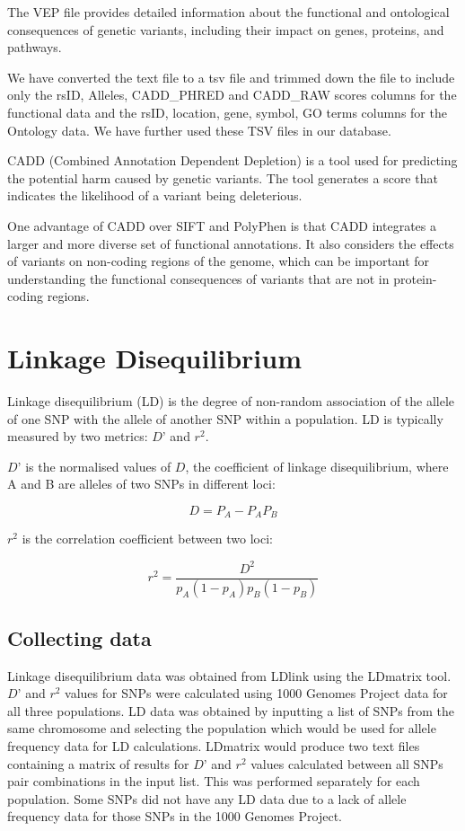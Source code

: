 \documentclass[12pt,a4paper]{article}
\newcommand{\sect}[1]{
\FloatBarrier %
\hypertarget{#1}{
\section{#1}\label{#1}}
}
\newcommand{\subsect}[1]{
\hypertarget{#1}{
\subsection{#1}\label{#1}}
}
\begin{document}
The VEP file provides detailed information about the functional and ontological consequences of genetic variants, including their impact on genes, proteins, and pathways.

We have converted the text file to a tsv file and trimmed down the file to include only the rsID, Alleles, CADD\_PHRED and CADD\_RAW scores columns for the functional data and the rsID, location, gene, symbol, GO terms columns for the Ontology data. We have further used these TSV files in our database.

CADD (Combined Annotation Dependent Depletion) is a tool used for predicting the potential harm caused by genetic variants. The tool generates a score that indicates the likelihood of a variant being deleterious.

One advantage of CADD over SIFT and PolyPhen is that CADD integrates a larger and more diverse set of functional annotations. It also considers the effects of variants on non-coding regions of the genome, which can be important for understanding the functional consequences of variants that are not in protein-coding regions.

\sect {Linkage Disequilibrium}

Linkage disequilibrium (LD) is the degree of non-random association of the allele of one SNP with the allele of another SNP within a population. LD is typically measured by two metrics: $D’$ and $r^2$.

$D’$ is the normalised values of $D$, the coefficient of linkage disequilibrium, where A and B are alleles of two SNPs in different loci:

\[D=P_A -  P_A P_B\]

$r^2$  is the correlation coefficient between two loci:

\[r^2 = \frac{D^2}{p_A(1-p_A)p_B(1-p_B)} \]


\subsect{Collecting data}

Linkage disequilibrium data was obtained from LDlink using the LDmatrix tool. $D’$ and $r^2$ values for SNPs were calculated using 1000 Genomes Project data for all three populations. LD data was obtained by inputting a list of SNPs from the same chromosome and selecting the population which would be used for allele frequency data for LD calculations. LDmatrix would produce two text files containing a matrix of results for $D’$ and $r^2$ values calculated between all SNPs pair combinations in the input list. This was performed separately for each population. Some SNPs did not have any LD data due to a lack of allele frequency data for those SNPs in the 1000 Genomes Project.
\end{document}
